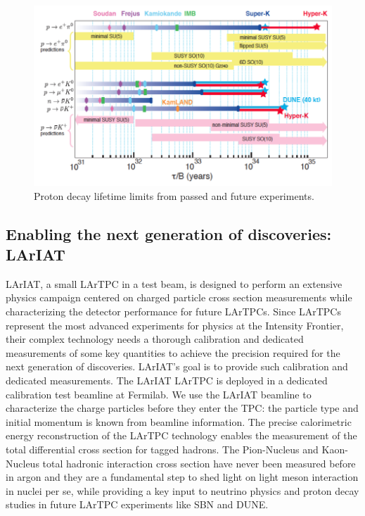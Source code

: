 \begin{figure}[hbpt]
\centering
\includegraphics[width=\textwidth]{Chapter-2/Images/PDKExperimentalLImit.png}
\caption{Proton decay lifetime limits from passed and future experiments.}
\label{fig:PDKExperimentalLImit}
\end{figure}


\subsection{Enabling the next generation of discoveries: LArIAT}\label{ch:LArIATIntro}
LArIAT, a small LArTPC in a test beam,  is designed to perform an extensive physics campaign centered on charged particle cross section measurements while characterizing the detector performance for future LArTPCs. Since LArTPCs represent the most advanced experiments for physics at the Intensity Frontier, their complex technology needs a thorough calibration and dedicated measurements of some key quantities to achieve the precision required for the next generation of discoveries.  LArIAT's goal is to provide such calibration and dedicated measurements. The LArIAT LArTPC is deployed in a dedicated calibration test beamline at Fermilab. We use the LArIAT beamline to characterize the charge particles before they enter the TPC: the particle type and initial momentum is known from beamline information. The precise calorimetric energy reconstruction of the LArTPC technology enables the measurement of the total differential cross section for  tagged hadrons. 
The Pion-Nucleus and Kaon-Nucleus total hadronic interaction cross section have never been measured before in argon and they are a fundamental step to shed light on light meson interaction in nuclei per se, while providing a key input to neutrino physics and proton decay studies in future LArTPC experiments like SBN and DUNE. 

